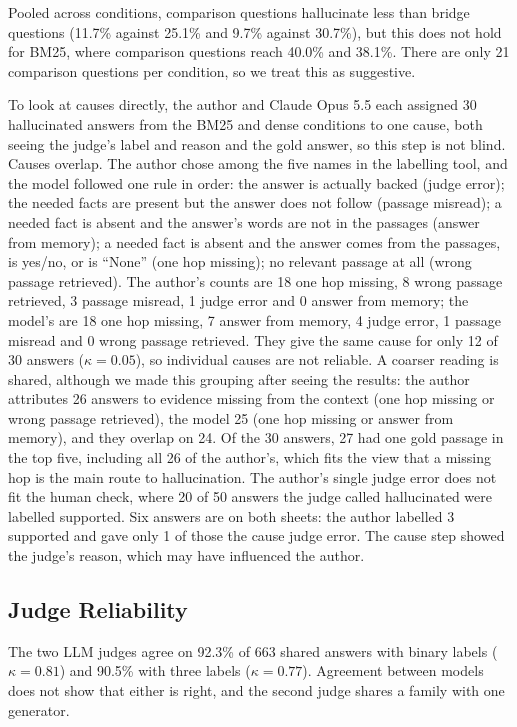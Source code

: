 \documentclass[10pt,a4paper,twocolumn]{article}
\begin{document}
Pooled across conditions, comparison questions hallucinate less than bridge questions (11.7\% against 25.1\% and 9.7\% against 30.7\%), but this does not hold for BM25,
where comparison questions reach 40.0\% and 38.1\%. There are only 21 comparison questions per condition, so we treat this as suggestive.

To look at causes directly, the author and Claude Opus 5.5 each assigned 30 hallucinated answers from the BM25 and dense conditions to one cause, both seeing the judge's label and reason and the gold answer, so this step is not blind. Causes overlap. The author chose among the five names in the labelling tool, and the model followed one rule in order: the answer is actually backed (judge error); the needed facts are present but the answer does not follow (passage misread); a needed fact is absent and the answer's words are not in the passages (answer from memory); a needed fact is absent and the answer comes from the passages, is yes/no, or is ``None'' (one hop missing); no relevant passage at all (wrong passage retrieved). The author's counts are 18 one hop missing, 8 wrong passage retrieved, 3 passage misread, 1 judge error and 0 answer from memory; the model's are 18 one hop missing, 7 answer from memory, 4 judge error, 1 passage misread and 0 wrong passage retrieved. They give the same cause for only 12 of 30 answers ($\kappa=0.05$), so individual causes are not reliable. A coarser reading is shared, although we made this grouping after seeing the results: the author attributes 26 answers to evidence missing from the context (one hop missing or wrong passage retrieved), the model 25 (one hop missing or answer from memory), and they overlap on 24. Of the 30 answers, 27 had one gold passage in the top five, including all 26 of the author's, which fits the view that a missing hop is the main route to hallucination. The author's single judge error does not fit the human check, where 20 of 50 answers the judge called hallucinated were labelled supported. Six answers are on both sheets: the author labelled 3 supported and gave only 1 of those the cause judge error. The cause step showed the judge's reason, which may have influenced the author.

\subsection{Judge Reliability}
The two LLM judges agree on 92.3\% of 663 shared answers with binary labels ($\kappa=0.81$) and 90.5\% with three labels ($\kappa=0.77$). Agreement between models does not show that
either is right, and the second judge shares a family with one generator.
\end{document}
